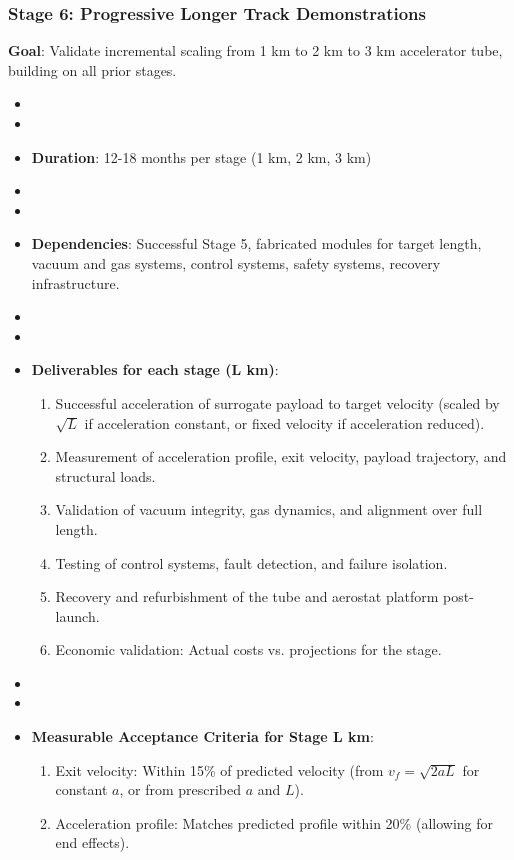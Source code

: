 \subsubsection{Stage 6: Progressive Longer Track Demonstrations}
\textbf{Goal}: Validate incremental scaling from 1 km to 2 km to 3 km accelerator tube, building on all prior stages.
\begin{itemize}
    \item \item \item \textbf{Duration}: 12-18 months per stage (1 km, 2 km, 3 km)
    \item \item \item \textbf{Dependencies}: Successful Stage 5, fabricated modules for target length, vacuum and gas systems, control systems, safety systems, recovery infrastructure.
    \item \item \item \textbf{Deliverables for each stage (L km)}:
        \begin{enumerate}
            \item Successful acceleration of surrogate payload to target velocity (scaled by $\sqrt{L}$ if acceleration constant, or fixed velocity if acceleration reduced).
            \item Measurement of acceleration profile, exit velocity, payload trajectory, and structural loads.
            \item Validation of vacuum integrity, gas dynamics, and alignment over full length.
            \item Testing of control systems, fault detection, and failure isolation.
            \item Recovery and refurbishment of the tube and aerostat platform post-launch.
            \item Economic validation: Actual costs vs. projections for the stage.
        \end{enumerate}
    \item \item \item \textbf{Measurable Acceptance Criteria for Stage L km}:
        \begin{enumerate}
            \item Exit velocity: Within 15\% of predicted velocity (from $v_f = \sqrt{2aL}$ for constant $a$, or from prescribed $a$ and $L$).
            \item Acceleration profile: Matches predicted profile within 20\% (allowing for end effects).

\end{enumerate}
\end{itemize}
